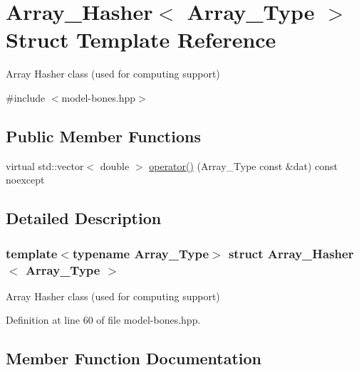 \hypertarget{struct_array___hasher}{}\section{Array\+\_\+\+Hasher$<$ Array\+\_\+\+Type $>$ Struct Template Reference}
\label{struct_array___hasher}


Array Hasher class (used for computing support)  




{\ttfamily \#include $<$model-\/bones.\+hpp$>$}

\subsection*{Public Member Functions}
\begin{DoxyCompactItemize}
\item 
virtual std\+::vector$<$ double $>$ \hyperlink{struct_array___hasher_a096dc8674477127f45a54ff4dc4038b0}{operator()} (Array\+\_\+\+Type const \&dat) const noexcept
\end{DoxyCompactItemize}


\subsection{Detailed Description}
\subsubsection*{template$<$typename Array\+\_\+\+Type$>$\newline
struct Array\+\_\+\+Hasher$<$ Array\+\_\+\+Type $>$}

Array Hasher class (used for computing support) 



Definition at line 60 of file model-\/bones.\+hpp.



\subsection{Member Function Documentation}
\mbox{\label{struct_array___hasher_a096dc8674477127f45a54ff4dc4038b0}} 
